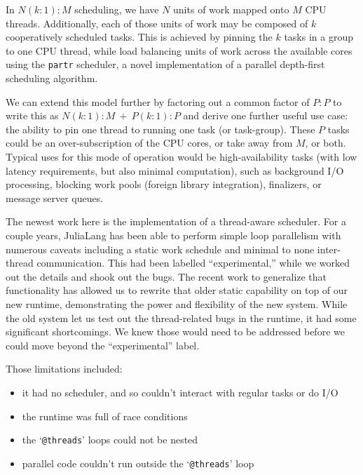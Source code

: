 \documentclass{juliacon}
\begin{document}
In $N (k \mathbin{:} 1) \mathbin{:} M$ scheduling, we have $N$ units of work mapped onto $M$ CPU threads. Additionally, each of those units of work may be composed of $k$ cooperatively scheduled tasks. This is achieved by pinning the $k$ tasks in a group to one CPU thread, while load balancing units of work across the available cores using the \verb|partr| scheduler, a novel implementation of a parallel depth-first scheduling algorithm.

We can extend this model further by factoring out a common factor of $P \mathbin{:} P$ to write this as $N (k \mathbin{:} 1) \mathbin{:} M\ +\ P(k \mathbin{:} 1) \mathbin{:} P$ and derive one further useful use case: the ability to pin one thread to running one task (or task-group). These $P$ tasks could be an over-subscription of the CPU cores, or take away from $M$, or both. Typical uses for this mode of operation would be high-availability tasks (with low latency requirements, but also minimal computation), such as background I/O processing, blocking work pools (foreign library integration), finalizers, or message server queues.

The newest work here is the implementation of a thread-aware scheduler. For a couple years, JuliaLang has been able to perform simple loop parallelism with numerous caveats including a static work schedule and minimal to none inter-thread communication. This had been labelled ``experimental,'' while we worked out the details and shook out the bugs. The recent work to generalize that functionality has allowed us to rewrite that older static capability on top of our new runtime, demonstrating the power and flexibility of the new system. While the old system let us test out the thread-related bugs in the runtime, it had some significant shortcomings. We knew those would need to be addressed before we could move beyond the ``experimental'' label.

Those limitations included:
\begin{itemize}
\item it had no scheduler, and so couldn't interact with regular tasks or do I/O
\item the runtime was full of race conditions
\item the `\verb|@threads|' loops could not be nested
\item parallel code couldn't run outside the `\verb|@threads|' loop
\end{itemize}
\end{document}
